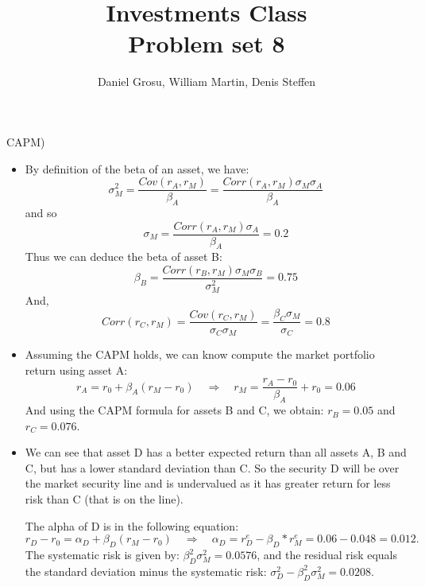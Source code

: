 \documentclass[10pt]{article}
\newenvironment{exercise}[2][Exercise]{\begin{trivlist}
  \item[\hskip \labelsep {\bfseries #1}\hskip \labelsep {\bfseries #2.}]}{\end{trivlist}}
\begin{document}
  \pagecolor{solar}
	
  \renewcommand{\qedsymbol}{\smiley}
	\title{Investments Class \\ Problem set 8}
	\author{Daniel Grosu, William Martin, Denis Steffen}
		
\maketitle

\begin{exercise}{1}(CAPM)
\end{exercise}
\begin{itemize}
  \item[(a)] By definition of the beta of an asset, we have: $$ \sigma_M^2 = \frac{Cov(r_A,r_M)}{\beta_A} = \frac{Corr(r_A,r_M)\sigma_M\sigma_A}{\beta_A}$$ and so $$ \sigma_M = \frac{Corr(r_A,r_M)\sigma_A}{\beta_A} = 0.2$$
  Thus we can deduce the beta of asset B: $$\beta_B = \frac{Corr(r_B,r_M)\sigma_M\sigma_B}{\sigma_M^2} = 0.75$$
  And, 
  $$Corr(r_C,r_M) = \frac{Cov(r_C,r_M)}{\sigma_C\sigma_M} = \frac{\beta_C\sigma_M}{\sigma_C}  = 0.8$$
  \item[(b)] Assuming the CAPM holds, we can know compute the market portfolio return using asset A: 
  $$ r_A = r_0 + \beta_A(r_M-r_0) \quad \Rightarrow \quad r_M = \frac{r_A-r_0}{\beta_A} + r_0 = 0.06$$ 
  And using the CAPM formula for assets B and C, we obtain: $ r_B = 0.05$ and $r_C = 0.076$.
  \item[(c)] We can see that asset D has a better expected return than all assets A, B and C, but has a lower standard deviation than C. So the security D will be over the market security line and is undervalued as it has greater return for less risk than C (that is on the line). 
  
  The alpha of D is in the following equation: 
  $$ r_D - r_0 = \alpha_D + \beta_D(r_M-r_0) \quad \Rightarrow \quad \alpha_D = r_D^e -\beta_D*r_M^e = 0.06 - 0.048 = 0.012.$$ 
  The systematic risk is given by: $\beta_D^2\sigma_M^2 = 0.0576$, and the residual risk equals the standard deviation minus the systematic risk: $\sigma_D^2-\beta_D^2\sigma_M^2 = 0.0208.$


\end{itemize}
\end{document}
